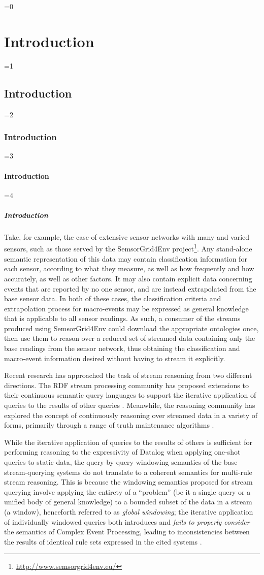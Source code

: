 \documentclass[twocolumn,preprint,3p,number]{elsarticle}
\theoremstyle{plain}
\theoremstyle{definition}
\newcounter{nestingdepth}
\newenvironment{nestedsection}[2]{
  \ifnum\value{nestingdepth}=0
    \chapter{#1}
  \else
    \ifnum\value{nestingdepth}=1
      \section{#1}
    \else
      \ifnum\value{nestingdepth}=2
        \subsection{#1}
      \else
        \ifnum\value{nestingdepth}=3
          \subsubsection{#1}
        \else
          \ifnum\value{nestingdepth}=4
            \paragraph{#1}
          \else
            \PackageError{nestedsections}{Maximum nesting level exceeded!}{uh oh!}
          \fi
        \fi
      \fi
    \fi
  \fi
  \addtocounter{nestingdepth}{1}
  \label{sec:#2}
}{\addtocounter{nestingdepth}{-1}}
\begin{document}
\begin{nestedsection}{Introduction}{intro}
  Take, for example, the case of extensive sensor networks with many and varied sensors, such as those served by the SemsorGrid4Env project\footnote{\url{http://www.semsorgrid4env.eu/}}.
  Any stand-alone semantic representation of this data may contain classification information for each sensor, according to what they measure, as well as how frequently and how accurately, as well as other factors.
  It may also contain explicit data concerning events that are reported by no one sensor, and are instead extrapolated from the base sensor data.
  In both of these cases, the classification criteria and extrapolation process for macro-events may be expressed as general knowledge that is applicable to all sensor readings.
  As such, a consumer of the streams produced using SemsorGrid4Env could download the appropriate ontologies once, then use them to reason over a reduced set of streamed data containing only the base readings from the sensor network, thus obtaining the classification and macro-event information desired without having to stream it explicitly.

  Recent research has approached the task of stream reasoning from two different directions.
  The RDF stream processing community has proposed extensions to their continuous semantic query languages to support the iterative application of queries to the results of other queries \citep{C-SPARQL,EP-SPARQL,walavalkar08streamingkb}.
  Meanwhile, the reasoning community has explored the concept of continuously reasoning over streamed data in a variety of forms, primarily through a range of truth maintenance algorithms \citep{dred,inc-materialisation,stream-truth-maintenance}.

  While the iterative application of queries to the results of others is sufficient for performing reasoning to the expressivity of Datalog when applying one-shot queries to static data, the query-by-query windowing semantics of the base stream-querying systems do not translate to a coherent semantics for multi-rule stream reasoning.
  This is because the windowing semantics proposed for stream querying involve applying the entirety of a ``problem'' (be it a single query or a unified body of general knowledge) to a bounded subset of the data in a stream (a window), henceforth referred to as \emph{global windowing};
  the iterative application of individually windowed queries both introduces and \emph{fails to properly consider} the semantics of Complex Event Processing, leading to inconsistencies between the results of identical rule sets expressed in the cited systems \citep{LARS}.
  

\end{nestedsection}
\end{document}
